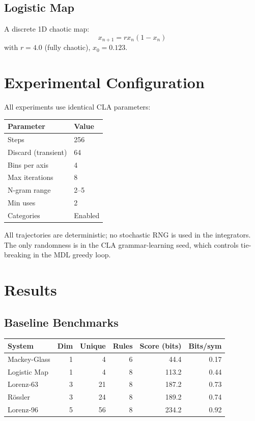 \documentclass[11pt]{article}
\begin{document}
\subsection{Logistic Map}

A discrete 1D chaotic map:
\begin{equation}
    x_{n+1} = r x_n(1 - x_n)
\end{equation}
with $r=4.0$ (fully chaotic), $x_0 = 0.123$.

\section{Experimental Configuration}

All experiments use identical CLA parameters:

\begin{center}
\begin{tabular}{ll}
\toprule
Parameter & Value \\
\midrule
Steps & 256 \\
Discard (transient) & 64 \\
Bins per axis & 4 \\
Max iterations & 8 \\
N-gram range & 2--5 \\
Min uses & 2 \\
Categories & Enabled \\
\bottomrule
\end{tabular}
\end{center}

All trajectories are deterministic; no stochastic RNG is used in the integrators. The only randomness is in the CLA grammar-learning seed, which controls tie-breaking in the MDL greedy loop.

\section{Results}

\subsection{Baseline Benchmarks}

\begin{center}
\begin{tabular}{lrrrrr}
\toprule
System & Dim & Unique & Rules & Score (bits) & Bits/sym \\
\midrule
Mackey-Glass & 1 & 4 & 6 & 44.4 & 0.17 \\
Logistic Map & 1 & 4 & 8 & 113.2 & 0.44 \\
Lorenz-63 & 3 & 21 & 8 & 187.2 & 0.73 \\
R\"ossler & 3 & 24 & 8 & 189.2 & 0.74 \\
Lorenz-96 & 5 & 56 & 8 & 234.2 & 0.92 \\
\bottomrule
\end{tabular}
\end{center}
\end{document}
